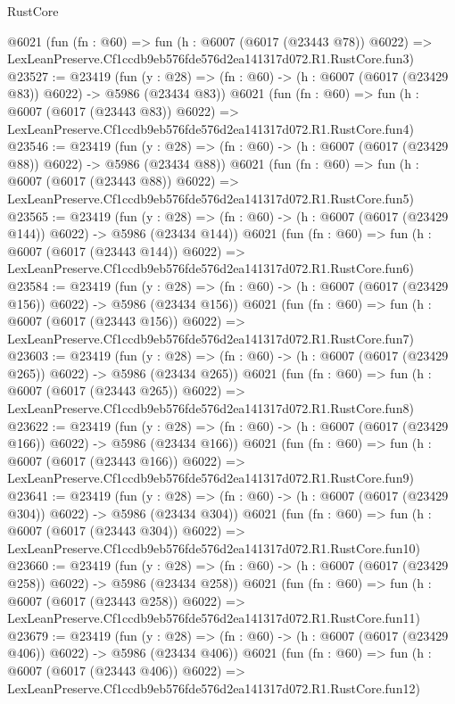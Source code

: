 \begin{lexlean}{RustCore}
\begin{coremodule}
    @6021
    (fun (fn : @60) =>
    fun (h : @6007 (@6017 (@23443 @78)) @6022) =>
    LexLeanPreserve.Cf1ccdb9eb576fde576d2ea141317d072.R1.RustCore.fun3)
@23527 := @23419
    (fun (y : @28) => (fn : @60) -> (h : @6007 (@6017 (@23429 @83)) @6022) -> @5986 (@23434 @83))
    @6021
    (fun (fn : @60) =>
    fun (h : @6007 (@6017 (@23443 @83)) @6022) =>
    LexLeanPreserve.Cf1ccdb9eb576fde576d2ea141317d072.R1.RustCore.fun4)
@23546 := @23419
    (fun (y : @28) => (fn : @60) -> (h : @6007 (@6017 (@23429 @88)) @6022) -> @5986 (@23434 @88))
    @6021
    (fun (fn : @60) =>
    fun (h : @6007 (@6017 (@23443 @88)) @6022) =>
    LexLeanPreserve.Cf1ccdb9eb576fde576d2ea141317d072.R1.RustCore.fun5)
@23565 := @23419
    (fun (y : @28) => (fn : @60) -> (h : @6007 (@6017 (@23429 @144)) @6022) -> @5986 (@23434 @144))
    @6021
    (fun (fn : @60) =>
    fun (h : @6007 (@6017 (@23443 @144)) @6022) =>
    LexLeanPreserve.Cf1ccdb9eb576fde576d2ea141317d072.R1.RustCore.fun6)
@23584 := @23419
    (fun (y : @28) => (fn : @60) -> (h : @6007 (@6017 (@23429 @156)) @6022) -> @5986 (@23434 @156))
    @6021
    (fun (fn : @60) =>
    fun (h : @6007 (@6017 (@23443 @156)) @6022) =>
    LexLeanPreserve.Cf1ccdb9eb576fde576d2ea141317d072.R1.RustCore.fun7)
@23603 := @23419
    (fun (y : @28) => (fn : @60) -> (h : @6007 (@6017 (@23429 @265)) @6022) -> @5986 (@23434 @265))
    @6021
    (fun (fn : @60) =>
    fun (h : @6007 (@6017 (@23443 @265)) @6022) =>
    LexLeanPreserve.Cf1ccdb9eb576fde576d2ea141317d072.R1.RustCore.fun8)
@23622 := @23419
    (fun (y : @28) => (fn : @60) -> (h : @6007 (@6017 (@23429 @166)) @6022) -> @5986 (@23434 @166))
    @6021
    (fun (fn : @60) =>
    fun (h : @6007 (@6017 (@23443 @166)) @6022) =>
    LexLeanPreserve.Cf1ccdb9eb576fde576d2ea141317d072.R1.RustCore.fun9)
@23641 := @23419
    (fun (y : @28) => (fn : @60) -> (h : @6007 (@6017 (@23429 @304)) @6022) -> @5986 (@23434 @304))
    @6021
    (fun (fn : @60) =>
    fun (h : @6007 (@6017 (@23443 @304)) @6022) =>
    LexLeanPreserve.Cf1ccdb9eb576fde576d2ea141317d072.R1.RustCore.fun10)
@23660 := @23419
    (fun (y : @28) => (fn : @60) -> (h : @6007 (@6017 (@23429 @258)) @6022) -> @5986 (@23434 @258))
    @6021
    (fun (fn : @60) =>
    fun (h : @6007 (@6017 (@23443 @258)) @6022) =>
    LexLeanPreserve.Cf1ccdb9eb576fde576d2ea141317d072.R1.RustCore.fun11)
@23679 := @23419
    (fun (y : @28) => (fn : @60) -> (h : @6007 (@6017 (@23429 @406)) @6022) -> @5986 (@23434 @406))
    @6021
    (fun (fn : @60) =>
    fun (h : @6007 (@6017 (@23443 @406)) @6022) =>
    LexLeanPreserve.Cf1ccdb9eb576fde576d2ea141317d072.R1.RustCore.fun12)

\end{coremodule}
\end{lexlean}
